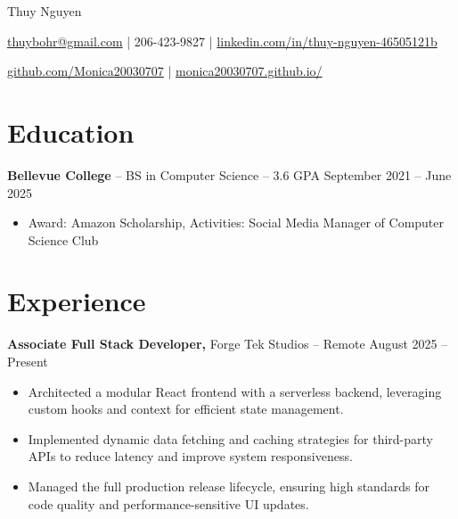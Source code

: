 \documentclass[11pt]{article}       %
\begin{document}
\centerline{\Huge Thuy Nguyen}

\vspace{5pt}

\centerline{\href{mailto:thuybohr@gmail.com}{thuybohr@gmail.com} | 206-423-9827 |
\href{https://www.linkedin.com/in/thuy-nguyen-46505121b/}{linkedin.com/in/thuy-nguyen-46505121b}}

\centerline{\href{https://github.com/Monica20030707}{github.com/Monica20030707} | 
\href{https://monica20030707.github.io/}{monica20030707.github.io/}} 

\vspace{-9pt}

\section*{Education}
\textbf{Bellevue College} -- BS in Computer Science -- 3.6 GPA \hfill September 2021 -- June 2025\\
\vspace{-9pt}
\begin{itemize}
  \item Award: Amazon Scholarship, Activities: Social Media Manager of Computer Science Club
\end{itemize}

\vspace{-18.5pt}

\section*{Experience}

\textbf{Associate Full Stack Developer,} {Forge Tek Studios} -- Remote \hfill August 2025 -- Present \\
\vspace{-9pt}
\begin{itemize}
  \item Architected a modular React frontend with a serverless backend, leveraging custom hooks and context for efficient state management.
  \item Implemented dynamic data fetching and caching strategies for third-party APIs to reduce latency and improve system responsiveness.
  \item Managed the full production release lifecycle, ensuring high standards for code quality and performance-sensitive UI updates.
\end{itemize}
\end{document}
